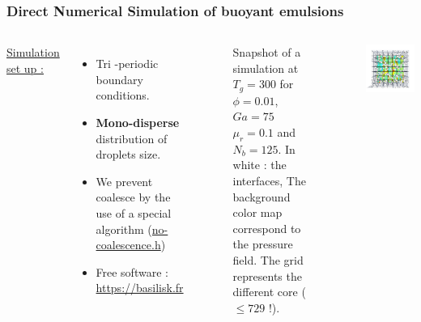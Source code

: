\documentclass{sintefbeamer}
\begin{document}
\begin{frame}
\frametitle{Direct Numerical Simulation of buoyant emulsions}
\begin{columns}
\underline{Simulation set up :} 
\begin{itemize}
  \item Tri -periodic boundary conditions. 
  \item \textbf{Mono-disperse} distribution of droplets size.
  \item We prevent coalesce by the use of a special algorithm 
  (\href{http://basilisk.fr/src/no-coalescence.h}{no-coalescence.h})
  \item Free software : \url{https://basilisk.fr}
\end{itemize}

\begin{figure}
  \caption{Snapshot of a simulation at $T_g = 300$ for $\phi = 0.01$, $Ga = 75$ $\mu_r = 0.1$ and $N_b = 125$. In white : the interfaces, The background color map correspond to the pressure field. The grid represents the different core ($\le 729$ !).
  }
\end{figure}
\centering
\includegraphics[width =  1.1\textwidth]{image/PHI_01_Ga_75.png}
\end{columns}
\end{frame}
\end{document}
